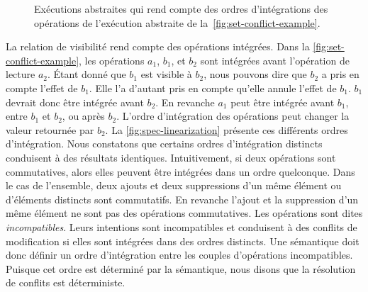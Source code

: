 \begin{figure}[htb]
\begin{subfigure}{\linewidth}
    \caption{}
\end{subfigure}
\caption[Impact d'ordres distincts d'intégration des opérations de modification sur un ensemble répliqué]{Exécutions abstraites qui rend compte des ordres d'intégrations des opérations de l'exécution abstraite de la~\autoref{fig:set-conflict-example}.}\label{fig:spec-linearization}
\end{figure}

La relation de visibilité rend compte des opérations intégrées.
Dans la \autoref{fig:set-conflict-example}, les opérations $a_1$, $b_1$, et $b_2$ sont intégrées avant l'opération de lecture $a_2$.
Étant donné que $b_1$ est visible à $b_2$, nous pouvons dire que $b_2$ a pris en compte l'effet de $b_1$.
Elle l'a d'autant pris en compte qu'elle annule l'effet de $b_1$.
$b_1$ devrait donc être intégrée avant $b_2$.
En revanche $a_1$ peut être intégrée avant $b_1$, entre $b_1$ et $b_2$, ou après $b_2$.
L'ordre d'intégration des opérations peut changer la valeur retournée par $b_2$.
La \autoref{fig:spec-linearization} présente ces différents ordres d'intégration.
Nous constatons que certains ordres d'intégration distincts conduisent à des résultats identiques.
Intuitivement, si deux opérations sont commutatives, alors elles peuvent être intégrées dans un ordre quelconque.
Dans le cas de l'ensemble, deux ajouts et deux suppressions d'un même élément ou d'éléments distincts sont commutatifs.
En revanche l'ajout et la suppression d'un même élément ne sont pas des opérations commutatives.
Les opérations sont dites \emph{incompatibles}.
Leurs intentions sont incompatibles et conduisent à des conflits de modification si elles sont intégrées dans des ordres distincts.
Une sémantique doit donc définir un ordre d'intégration entre les couples d'opérations incompatibles.
Puisque cet ordre est déterminé par la sémantique, nous disons que la résolution de conflits est déterministe.

